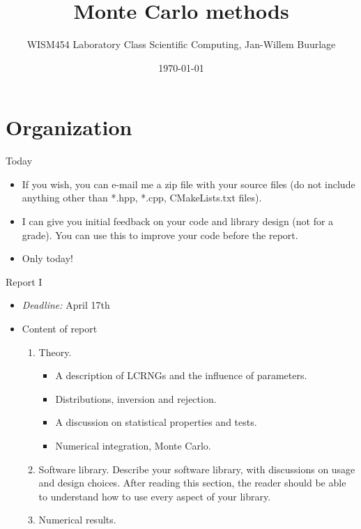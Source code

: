 \documentclass[10pt]{beamer}
\author{WISM454 Laboratory Class Scientific Computing, Jan-Willem Buurlage}
\date{\today}
\title{Monte Carlo methods}
\begin{document}
\maketitle

\section{Organization}
\label{sec:org4cdad8f}
\begin{frame}[label={sec:org2e64313}]{Today}
\begin{itemize}
\item If you wish, you can e-mail me a zip file with your source files (do not
include anything other than *.hpp, *.cpp, CMakeLists.txt files).
\item I can give you initial feedback on your code and library design (not for a
grade). You can use this to improve your code before the report.
\item Only today!
\end{itemize}
\end{frame}
\begin{frame}[label={sec:org12f9393}]{Report I}
\begin{itemize}
\item \emph{Deadline:} April 17th
\item Content of report
\begin{enumerate}
\item \alert{Theory}.
\begin{itemize}
\item A description of LCRNGs and the influence of parameters.
\item Distributions, inversion and rejection.
\item A discussion on statistical properties and tests.
\item Numerical integration, Monte Carlo.
\end{itemize}
\item \alert{Software library}. Describe your software library, with discussions on usage
and design choices. After reading this section, the reader should be able to
understand how to use every aspect of your library.
\item \alert{Numerical results}.
\end{enumerate}
\end{itemize}
\end{frame}
\end{document}
